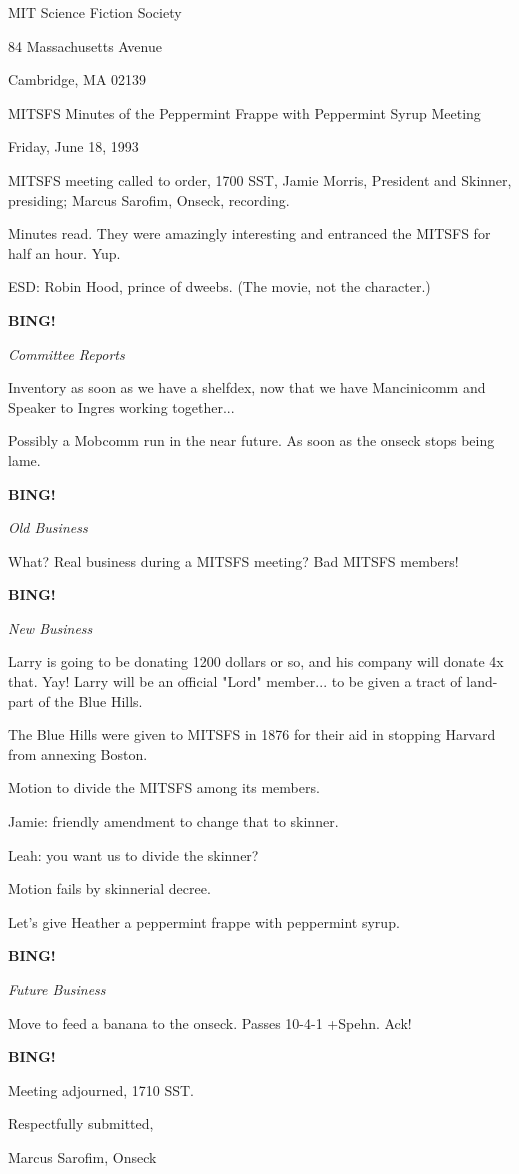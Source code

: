 \documentclass[12pt]{article}
\newcommand{\bing}{{\bf BING!} }
\newcommand{\goto}[1]{\bing \vskip 12pt \centerline{{\em{#1}}}}
\begin{document}
\begin{center}

MIT Science Fiction Society 

84 Massachusetts Avenue

Cambridge, MA 02139

\vspace{12pt}

MITSFS Minutes of the Peppermint Frappe with Peppermint Syrup Meeting 

Friday, June 18, 1993

\end{center}
 
\vspace{18pt}

\setlength{\parskip}{6pt}

\noindent
MITSFS meeting called to order, 1700 SST,
Jamie Morris, President and Skinner, presiding; Marcus Sarofim, Onseck, recording.

Minutes read. They were amazingly interesting and entranced the MITSFS for half an hour. Yup.

ESD: Robin Hood, prince of dweebs. (The movie, not the character.)

\goto{Committee Reports}

Inventory as soon as we have a shelfdex, now that we have Mancinicomm and Speaker to Ingres working together...

Possibly a Mobcomm run in the near future. As soon as the onseck stops being lame.

\goto{Old Business}

What? Real business during a MITSFS meeting? Bad MITSFS members!

\goto{New Business}

Larry is going to be donating 1200 dollars or so, and his company will donate 4x that. Yay! Larry will be an official "Lord" member... to be given a tract of land- part of the Blue Hills.

The Blue Hills were given to MITSFS in 1876 for their aid in stopping Harvard from annexing Boston.

Motion to divide the MITSFS among its members.

Jamie: friendly amendment to change that to skinner.

Leah: you want us to divide the skinner?

Motion fails by skinnerial decree.

Let's give Heather a peppermint frappe with peppermint syrup.

\goto{Future Business}

Move to feed a banana to the onseck. Passes 10-4-1 +Spehn. Ack!

\bing

\vspace{12pt}

\noindent
Meeting adjourned, 1710 SST.

\vspace{18pt}

\centerline{Respectfully submitted,}
\centerline{Marcus Sarofim, Onseck}
\end{document}
